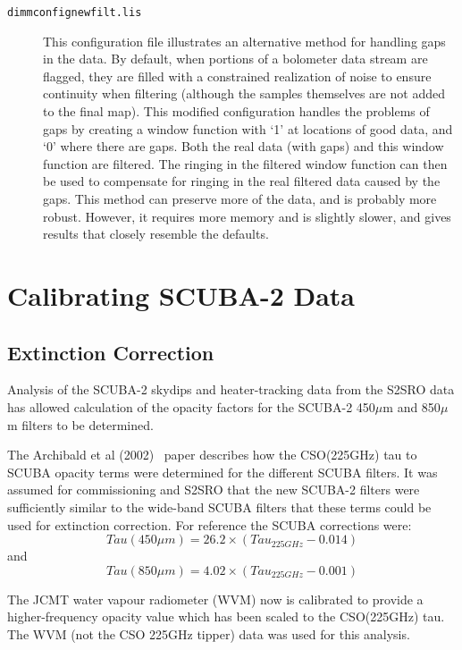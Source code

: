 \documentclass[twoside,11pt]{article}
\newcommand{\xlabel}[1]{}
\renewcommand{\_}{\texttt{\symbol{95}}}
\begin{document}
\begin{description}
\item[\texttt{dimmconfig\_newfilt.lis}] This configuration file
  illustrates an alternative method for handling gaps in the data. By
  default, when portions of a bolometer data stream are flagged, they
  are filled with a constrained realization of noise to ensure
  continuity when filtering (although the samples themselves are not
  added to the final map). This modified configuration handles the
  problems of gaps by creating a window function with `1' at locations
  of good data, and `0' where there are gaps. Both the real data (with
  gaps) and this window function are filtered. The ringing in the
  filtered window function can then be used to compensate for ringing
  in the real filtered data caused by the gaps. This method can
  preserve more of the data, and is probably more robust. However, it
  requires more memory and is slightly slower, and gives results that
  closely resemble the defaults.

\end{description}

\section{\xlabel{calib}Calibrating SCUBA-2 Data}
\label{sec:calib}

\subsection{Extinction Correction}

Analysis of the SCUBA-2 skydips and heater-tracking data from the
S2SRO data has allowed calculation of the opacity factors for the
SCUBA-2 450$\mu$m and 850$\mu$m filters to be determined.

The Archibald et al (2002)~\cite{archibald} paper describes how the
CSO(225GHz) tau to SCUBA opacity terms were determined for the
different SCUBA filters. It was assumed for commissioning and S2SRO
that the new SCUBA-2 filters were sufficiently similar to the
wide-band SCUBA filters that these terms could be used for extinction
correction. For reference the SCUBA corrections were:
\begin{equation}
Tau(450\mu m) = 26.2 \times (Tau_{225GHz} - 0.014)
\end{equation}
and
\begin{equation}
Tau(850\mu m) = 4.02 \times (Tau_{225GHz} - 0.001)
\end{equation}

The JCMT water vapour radiometer (WVM) now is calibrated to provide a
higher-frequency opacity value which has been scaled to the
CSO(225GHz) tau. The WVM (not the CSO 225GHz tipper) data was used for
this analysis.
\end{document}
